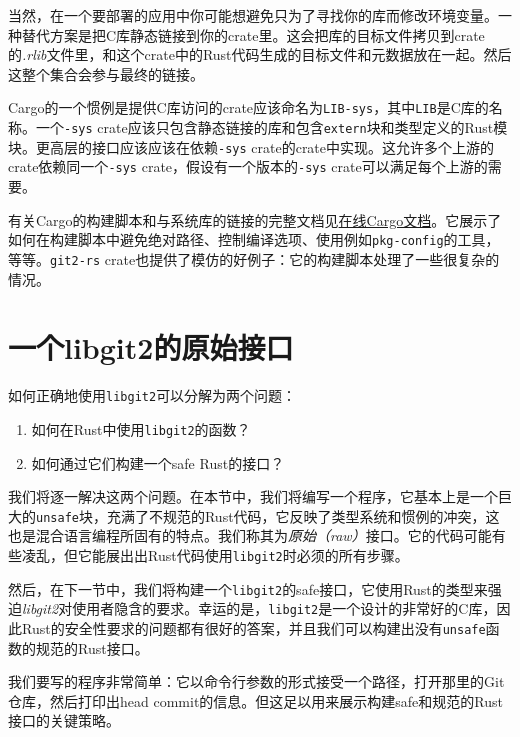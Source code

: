 当然，在一个要部署的应用中你可能想避免只为了寻找你的库而修改环境变量。一种替代方案是把C库静态链接到你的crate里。这会把库的目标文件拷贝到crate的\emph{.rlib}文件里，和这个crate中的Rust代码生成的目标文件和元数据放在一起。然后这整个集合会参与最终的链接。

Cargo的一个惯例是提供C库访问的crate应该命名为\texttt{LIB-sys}，其中\texttt{LIB}是C库的名称。一个\texttt{-sys} crate应该只包含静态链接的库和包含\texttt{extern}块和类型定义的Rust模块。更高层的接口应该应该在依赖\texttt{-sys} crate的crate中实现。这允许多个上游的crate依赖同一个\texttt{-sys} crate，假设有一个版本的\texttt{-sys} crate可以满足每个上游的需要。

有关Cargo的构建脚本和与系统库的链接的完整文档见\href{https://doc.rust-lang.org/cargo/reference/build-scripts.html}{在线Cargo文档}。它展示了如何在构建脚本中避免绝对路径、控制编译选项、使用例如\texttt{pkg-config}的工具，等等。\texttt{git2-rs} crate也提供了模仿的好例子：它的构建脚本处理了一些很复杂的情况。

\section{一个libgit2的原始接口}
如何正确地使用\texttt{libgit2}可以分解为两个问题：
\begin{enumerate}
    \item 如何在Rust中使用\texttt{libgit2}的函数？
    \item 如何通过它们构建一个safe Rust的接口？
\end{enumerate}

我们将逐一解决这两个问题。在本节中，我们将编写一个程序，它基本上是一个巨大的\texttt{unsafe}块，充满了不规范的Rust代码，它反映了类型系统和惯例的冲突，这也是混合语言编程所固有的特点。我们称其为\emph{原始（raw）}接口。它的代码可能有些凌乱，但它能展出出Rust代码使用\texttt{libgit2}时必须的所有步骤。

然后，在下一节中，我们将构建一个\texttt{libgit2}的safe接口，它使用Rust的类型来强迫\emph{libgit2}对使用者隐含的要求。幸运的是，\texttt{libgit2}是一个设计的非常好的C库，因此Rust的安全性要求的问题都有很好的答案，并且我们可以构建出没有\texttt{unsafe}函数的规范的Rust接口。

我们要写的程序非常简单：它以命令行参数的形式接受一个路径，打开那里的Git仓库，然后打印出head commit的信息。但这足以用来展示构建safe和规范的Rust接口的关键策略。

